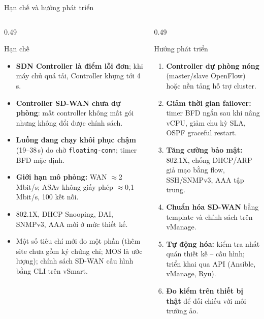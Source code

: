 \documentclass[aspectratio=169, 10pt, xcolor={table}]{beamer}
\newcommand{\compactlist}{\setlength{\itemsep}{1pt}\setlength{\parskip}{0pt}}
\begin{document}
\begin{frame}{Hạn chế và hướng phát triển}
    \begin{columns}[T]
        \begin{column}{0.49\textwidth}
            \begin{card}[badRed]{Hạn chế}
                \scriptsize
                \begin{itemize}\compactlist
                    \item \textbf{SDN Controller là điểm lỗi đơn}; khi máy chủ quá tải, Controller khựng tới 4\,s.
                    \item \textbf{Controller SD-WAN chưa dự phòng}: mất controller không mất gói nhưng không đổi được chính sách.
                    \item \textbf{Luồng đang chạy khôi phục chậm} (19--38\,s) do chờ \texttt{floating-conn}; timer BFD mặc định.
                    \item \textbf{Giới hạn mô phỏng:} WAN $\approx$2\,Mbit/s; ASAv không giấy phép $\approx$0,1\,Mbit/s, 100 kết nối.
                    \item 802.1X, DHCP Snooping, DAI, SNMPv3, AAA mới ở mức thiết kế.
                    \item Một số tiêu chí mới đo một phần (thêm site chưa gồm ký chứng chỉ; MOS là ước lượng); chính sách SD-WAN cấu hình bằng CLI trên vSmart.
                \end{itemize}
            \end{card}
        \end{column}
        \begin{column}{0.49\textwidth}
            \begin{card}[okGreen]{Hướng phát triển}
                \scriptsize
                \begin{enumerate}\compactlist
                    \item \textbf{Controller dự phòng nóng} (master/slave OpenFlow) hoặc nền tảng hỗ trợ cluster.
                    \item \textbf{Giảm thời gian failover:} timer BFD ngắn sau khi nâng vCPU, giảm chu kỳ SLA, OSPF graceful restart.
                    \item \textbf{Tăng cường bảo mật:} 802.1X, chống DHCP/ARP giả mạo bằng flow, SSH/SNMPv3, AAA tập trung.
                    \item \textbf{Chuẩn hóa SD-WAN} bằng template và chính sách trên vManage.
                    \item \textbf{Tự động hóa:} kiểm tra nhất quán thiết kế -- cấu hình; triển khai qua API (Ansible, vManage, Ryu).
                    \item \textbf{Đo kiểm trên thiết bị thật} để đối chiếu với môi trường ảo.
                \end{enumerate}
            \end{card}
        \end{column}
    \end{columns}
\end{frame}
\end{document}
